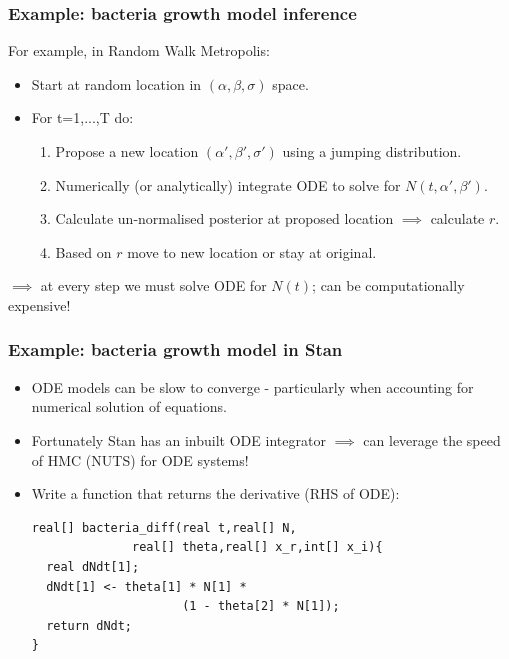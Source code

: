 \documentclass[handout]{beamer}
\begin{document}
\begin{frame}
	\frametitle{Example: bacteria growth model inference}
	
	 For example, in Random Walk Metropolis:
	
	\begin{itemize}
		\item<3-> Start at random location in $(\alpha,\beta,\sigma)$ space.
		\item<4-> For t=1,...,T do:
		\begin{enumerate}
			\item<5-> Propose a new location $(\alpha',\beta',\sigma')$ using a jumping distribution.
			\item<6-> Numerically (or analytically) integrate ODE to solve for $N(t,\alpha',\beta')$.
			\item<7-> Calculate un-normalised posterior at proposed location $\implies$ calculate $r$.
			\item<8-> Based on $r$ move to new location or stay at original.
		\end{enumerate}
	\end{itemize}

	$\implies$ at every step we must solve ODE for $N(t)$; can be computationally expensive!
	
\end{frame}

\begin{frame}[fragile]
	\frametitle{Example: bacteria growth model in Stan}
	\begin{itemize}
		\item<2-> ODE models can be slow to converge - particularly when accounting for numerical solution of equations.
		\item<3-> Fortunately Stan has an inbuilt ODE integrator $\implies$ can leverage the speed of HMC (NUTS) for ODE systems!
		\item<4-> Write a function that returns the derivative (RHS of ODE):
		\onslide<5->
\begin{verbatim}
real[] bacteria_diff(real t,real[] N,
              real[] theta,real[] x_r,int[] x_i){
  real dNdt[1];
  dNdt[1] <- theta[1] * N[1] * 
                     (1 - theta[2] * N[1]);
  return dNdt;
}
\end{verbatim}
		
	\end{itemize}
	
	
\end{frame}
\end{document}
